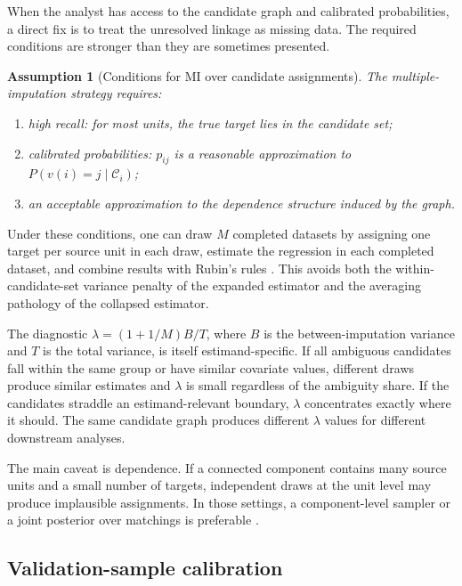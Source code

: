 \documentclass[12pt]{article}
\newtheorem{assumption}{Assumption}
\theoremstyle{remark}
\begin{document}
When the analyst has access to the candidate graph and calibrated probabilities, a direct fix is to treat the unresolved linkage as missing data. The required conditions are stronger than they are sometimes presented.

\begin{assumption}[Conditions for MI over candidate assignments]
The multiple-imputation strategy requires:
\begin{enumerate}
\item high recall: for most units, the true target lies in the candidate set;
\item calibrated probabilities: $p_{ij}$ is a reasonable approximation to $P(v(i)=j\mid \mathcal C_i)$;
\item an acceptable approximation to the dependence structure induced by the graph.
\end{enumerate}
\end{assumption}

Under these conditions, one can draw $M$ completed datasets by assigning one target per source unit in each draw, estimate the regression in each completed dataset, and combine results with Rubin's rules \citep{rubin1987}. This avoids both the within-candidate-set variance penalty of the expanded estimator and the averaging pathology of the collapsed estimator.

The diagnostic $\lambda = (1+1/M)B/T$, where $B$ is the between-imputation variance and $T$ is the total variance, is itself estimand-specific. If all ambiguous candidates fall within the same group or have similar covariate values, different draws produce similar estimates and $\lambda$ is small regardless of the ambiguity share. If the candidates straddle an estimand-relevant boundary, $\lambda$ concentrates exactly where it should. The same candidate graph produces different $\lambda$ values for different downstream analyses.

The main caveat is dependence. If a connected component contains many source units and a small number of targets, independent draws at the unit level may produce implausible assignments. In those settings, a component-level sampler or a joint posterior over matchings is preferable \citep{tancredi2011,steorts2016}.

\subsection{Validation-sample calibration}
\end{document}
